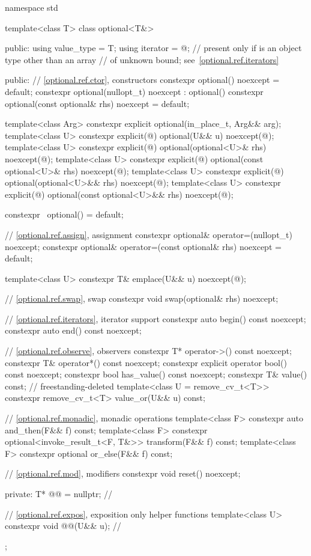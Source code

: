 \begin{codeblock}
namespace std {
  template<class T>
  class optional<T&> {
  public:
    using value_type = T;
    using iterator   = @\impdefnc@;  // present only if  is an object type other than an array
                                                // of unknown bound; see~\ref{optional.ref.iterators}

  public:
    // \ref{optional.ref.ctor}, constructors
    constexpr optional() noexcept = default;
    constexpr optional(nullopt_t) noexcept : optional() {}
    constexpr optional(const optional& rhs) noexcept = default;

    template<class Arg>
      constexpr explicit optional(in_place_t, Arg&& arg);
    template<class U>
      constexpr explicit(@\seebelow@) optional(U&& u) noexcept(@\seebelow@);
    template<class U>
      constexpr explicit(@\seebelow@) optional(optional<U>& rhs) noexcept(@\seebelow@);
    template<class U>
      constexpr explicit(@\seebelow@) optional(const optional<U>& rhs) noexcept(@\seebelow@);
    template<class U>
      constexpr explicit(@\seebelow@) optional(optional<U>&& rhs) noexcept(@\seebelow@);
    template<class U>
      constexpr explicit(@\seebelow@) optional(const optional<U>&& rhs) noexcept(@\seebelow@);

    constexpr ~optional() = default;

    // \ref{optional.ref.assign}, assignment
    constexpr optional& operator=(nullopt_t) noexcept;
    constexpr optional& operator=(const optional& rhs) noexcept = default;

    template<class U> constexpr T& emplace(U&& u) noexcept(@\seebelow@);

    // \ref{optional.ref.swap}, swap
    constexpr void swap(optional& rhs) noexcept;

    // \ref{optional.ref.iterators}, iterator support
    constexpr auto begin() const noexcept;
    constexpr auto end() const noexcept;

    // \ref{optional.ref.observe}, observers
    constexpr T*       operator->() const noexcept;
    constexpr T&       operator*() const noexcept;
    constexpr explicit operator bool() const noexcept;
    constexpr bool     has_value() const noexcept;
    constexpr T&       value() const;                           // freestanding-deleted
    template<class U = remove_cv_t<T>>
      constexpr remove_cv_t<T> value_or(U&& u) const;

    // \ref{optional.ref.monadic}, monadic operations
    template<class F> constexpr auto and_then(F&& f) const;
    template<class F> constexpr optional<invoke_result_t<F, T&>> transform(F&& f) const;
    template<class F> constexpr optional or_else(F&& f) const;

    // \ref{optional.ref.mod}, modifiers
    constexpr void reset() noexcept;

  private:
    T* @@ = nullptr;                                           // \expos

    // \ref{optional.ref.expos}, exposition only helper functions
    template<class U>
      constexpr void @@(U&& u);               // \expos
  };
}
\end{codeblock}

